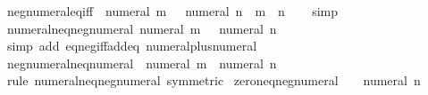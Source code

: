 \begin{isabellebody}
\endisatagproof
{\isafoldproof}%
%
\isadelimproof
\isanewline
%
\endisadelimproof
\isanewline
{}\isamarkupfalse%
\ neg{\isacharunderscore}{\kern0pt}numeral{\isacharunderscore}{\kern0pt}eq{\isacharunderscore}{\kern0pt}iff{\isacharcolon}{\kern0pt}\ {\isachardoublequoteopen}{\isacharminus}{\kern0pt}\ numeral\ m\ {\isacharequal}{\kern0pt}\ {\isacharminus}{\kern0pt}\ numeral\ n\ {\isasymlongleftrightarrow}\ m\ {\isacharequal}{\kern0pt}\ n{\isachardoublequoteclose}\isanewline
%
\isadelimproof
\ \ %
\endisadelimproof
%
\isatagproof
{}\isamarkupfalse%
\ simp%
\endisatagproof
{\isafoldproof}%
%
\isadelimproof
\isanewline
%
\endisadelimproof
\isanewline
{}\isamarkupfalse%
\ numeral{\isacharunderscore}{\kern0pt}neq{\isacharunderscore}{\kern0pt}neg{\isacharunderscore}{\kern0pt}numeral{\isacharcolon}{\kern0pt}\ {\isachardoublequoteopen}numeral\ m\ {\isasymnoteq}\ {\isacharminus}{\kern0pt}\ numeral\ n{\isachardoublequoteclose}\isanewline
%
\isadelimproof
\ \ %
\endisadelimproof
%
\isatagproof
{}\isamarkupfalse%
\ {\isacharparenleft}{\kern0pt}simp\ add{\isacharcolon}{\kern0pt}\ eq{\isacharunderscore}{\kern0pt}neg{\isacharunderscore}{\kern0pt}iff{\isacharunderscore}{\kern0pt}add{\isacharunderscore}{\kern0pt}eq{\isacharunderscore}{\kern0pt}{}\ numeral{\isacharunderscore}{\kern0pt}plus{\isacharunderscore}{\kern0pt}numeral{\isacharparenright}{\kern0pt}%
\endisatagproof
{\isafoldproof}%
%
\isadelimproof
\isanewline
%
\endisadelimproof
\isanewline
{}\isamarkupfalse%
\ neg{\isacharunderscore}{\kern0pt}numeral{\isacharunderscore}{\kern0pt}neq{\isacharunderscore}{\kern0pt}numeral{\isacharcolon}{\kern0pt}\ {\isachardoublequoteopen}{\isacharminus}{\kern0pt}\ numeral\ m\ {\isasymnoteq}\ numeral\ n{\isachardoublequoteclose}\isanewline
%
\isadelimproof
\ \ %
\endisadelimproof
%
\isatagproof
{}\isamarkupfalse%
\ {\isacharparenleft}{\kern0pt}rule\ numeral{\isacharunderscore}{\kern0pt}neq{\isacharunderscore}{\kern0pt}neg{\isacharunderscore}{\kern0pt}numeral\ {\isacharbrackleft}{\kern0pt}symmetric{\isacharbrackright}{\kern0pt}{\isacharparenright}{\kern0pt}%
\endisatagproof
{\isafoldproof}%
%
\isadelimproof
\isanewline
%
\endisadelimproof
\isanewline
{}\isamarkupfalse%
\ zero{\isacharunderscore}{\kern0pt}neq{\isacharunderscore}{\kern0pt}neg{\isacharunderscore}{\kern0pt}numeral{\isacharcolon}{\kern0pt}\ {\isachardoublequoteopen}{}\ {\isasymnoteq}\ {\isacharminus}{\kern0pt}\ numeral\ n{\isachardoublequoteclose}\isanewline
%
\isadelimproof
\ \ %
\endisadelimproof
%

\end{isabellebody}
